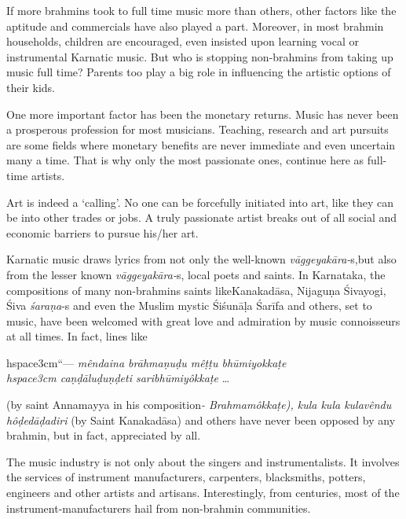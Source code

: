If more brahmins took to full time music more than others, other factors like the aptitude and commercials have also played a part. Moreover, in most brahmin households, children are encouraged, even insisted upon learning vocal or instrumental Karnatic music. But who is stopping non-brahmins from taking up music full time? Parents too play a big role in influencing the artistic options of their kids.

One more important factor has been the monetary returns. Music has never been a prosperous profession for most musicians. Teaching, research and art pursuits are some fields where monetary benefits are never immediate and even uncertain many a time. That is why only the most passionate ones, continue here as full-time artists.

Art is indeed a ‘calling’. No one can be forcefully initiated into art, like they can be into other trades or jobs. A truly passionate artist breaks out of all social and economic barriers to pursue his/her art.

Karnatic music draws lyrics from not only the well-known \textit{vāggeyakāra-}s,\break but also from the lesser known \textit{vāggeyakāra-}s, local poets and saints. In Karnataka, the compositions of many non-brahmins saints like\break Kanakadāsa, Nijaguṇa Śivayogi, Śiva \textit{śaraṇa}-s and even the Muslim mystic Śiśunāḷa Śarīfa and others, set to music, have been welcomed with great love and admiration by music connoisseurs at all times. In fact, lines like

\begin{myquote}
hspace{3cm}“--- \textit{mêndaina brāhmaṇuḍu mêṭṭu bhūmiyokkaṭe \\hspace{3cm} caṇḍāluḍuṇḍeti saribhūmiyôkkaṭe} … 
\end{myquote}

(by saint Annamayya in his composition\textit{- Brahmamôkkaṭe), kula kula kulavêndu hôḍedāḍadiri} (by Saint Kanakadāsa) and others have never been opposed by any brahmin, but in fact, appreciated by all.

The music industry is not only about the singers and instrumentalists. It involves the services of instrument manufacturers, carpenters, blacksmiths, potters, engineers and other artists and artisans. Interestingly, from centuries, most of the instrument-manufacturers hail from non-brahmin communities.

